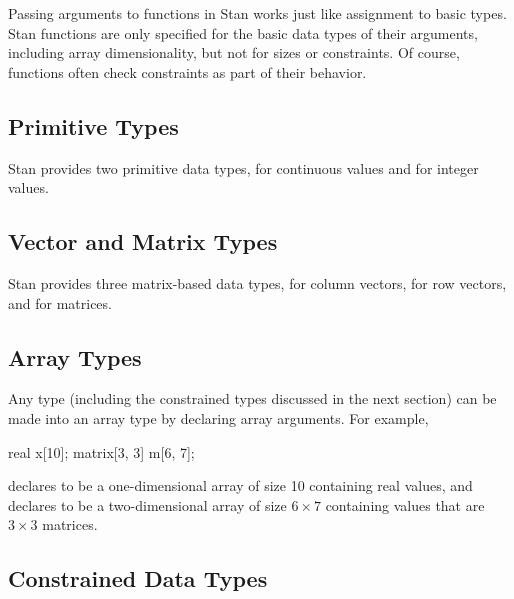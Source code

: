 Passing arguments to functions in Stan works just like assignment to
basic types.  Stan functions are only specified for the basic data
types of their arguments, including array dimensionality, but not for
sizes or constraints.  Of course, functions often check constraints as
part of their behavior.  

\subsection{Primitive Types}

Stan provides two primitive data types,  for continuous
values and  for integer values.

\subsection{Vector and Matrix Types}
Stan provides three matrix-based data types,  for column
vectors,  for row vectors, and  for
matrices.

\subsection{Array Types}

Any type (including the constrained types discussed in the next
section) can be made into an array type by declaring array arguments.
For example,
%
\begin{stancode}
real x[10];
matrix[3, 3] m[6, 7];
\end{stancode}
%
declares  to be a one-dimensional array of size 10 containing
real values, and declares  to be a two-dimensional array of
size $6 \times 7$ containing values that are $3 \times 3$ matrices.



\subsection{Constrained Data Types}

